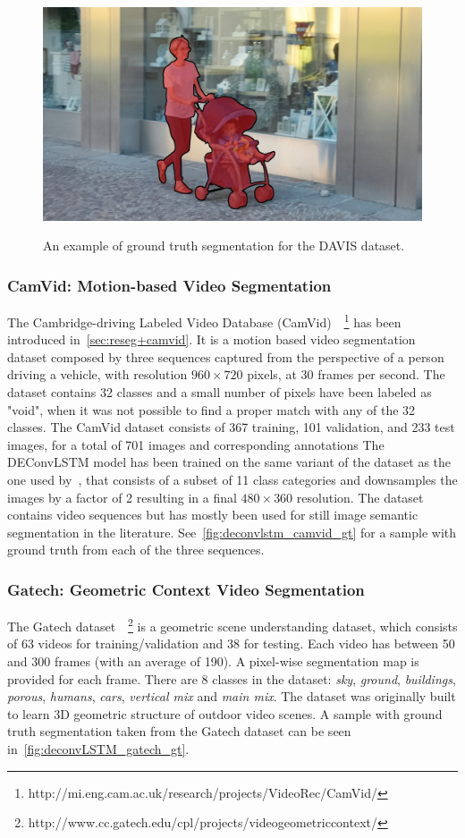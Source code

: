 \begin{figure}[t]
    \includegraphics[width=0.3\columnwidth]{img/deconvLSTM/davis_gt9.jpg}\\
    \caption{An example of ground truth segmentation for the DAVIS dataset.}
    \label{fig:deconvlstm_davis_gt}
\end{figure}


\subsubsection{CamVid: Motion-based Video Segmentation}
\label{sec:deconvLSTM_camvid}
The Cambridge-driving Labeled Video Database (CamVid)~\citep{
Brostow2010semantic}~\footnote{%
http://mi.eng.cam.ac.uk/research/projects/VideoRec/CamVid/}
has been introduced in~\autoref{sec:reseg+camvid}. It is a motion based video
segmentation dataset composed by three sequences captured from the perspective
of a person driving a vehicle, with resolution $960 \times 720$ pixels, at 30
frames per second. The dataset contains 32 classes and a small number of pixels
have been labeled as "void", when it was not possible to find a proper match
with any of the 32 classes. The CamVid dataset consists of 367 training, 101
validation, and 233 test images, for a total of 701 images and corresponding
annotations The DEConvLSTM model has been trained on the same variant of the
dataset as the one used by~\citep{badrinarayanan2015segnet}, that consists of a
subset of 11 class categories and downsamples the images by a factor of 2
resulting in a final $480 \times 360$ resolution. The dataset contains video
sequences but has mostly been used for still image semantic segmentation in the
literature. See~\autoref{fig:deconvlstm_camvid_gt} for a sample with ground
truth from each of the three sequences.


\subsubsection{Gatech: Geometric Context Video Segmentation}
\label{sec:deconvLSTM_gatech}
The Gatech dataset~\citep{VideoGeometricContext2013}~\footnote{%
http://www.cc.gatech.edu/cpl/projects/videogeometriccontext/}
is a geometric scene understanding dataset, which consists of 63 videos for
training/validation and 38 for testing. Each video has between 50 and 300
frames (with an average of 190). A pixel-wise segmentation map is provided for
each frame. There are 8 classes in the dataset: \textit{sky}, \textit{ground},
\textit{buildings}, \textit{porous}, \textit{humans}, \textit{cars},
\textit{vertical mix} and \textit{main mix}. The dataset was originally built
to learn 3D geometric structure of outdoor video scenes. A sample with ground
truth segmentation taken from the Gatech dataset can be seen
in~\autoref{fig:deconvLSTM_gatech_gt}.


